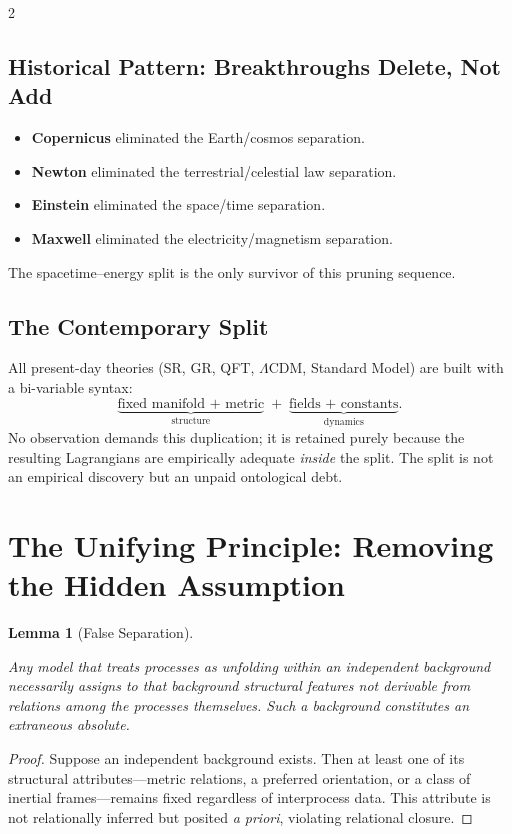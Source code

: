 \documentclass[10pt, a4paper]{article}
\newtheorem{lemma}[theorem]{Lemma}
\begin{document}
\begin{multicols}{2}
\subsection{Historical Pattern: Breakthroughs Delete, Not Add}
\begin{itemize}[nosep]
  \item \textbf{Copernicus} eliminated the Earth/cosmos separation.
  \item \textbf{Newton} eliminated the terrestrial/celestial law separation.
  \item \textbf{Einstein} eliminated the space/time separation.
  \item \textbf{Maxwell} eliminated the electricity/magnetism separation.
\end{itemize}
The spacetime--energy split is the only survivor of this pruning sequence.

\subsection{The Contemporary Split}
All present-day theories (SR, GR, QFT, $\Lambda$CDM, Standard Model) are built with a bi-variable syntax:
\[
\underbrace{\text{fixed manifold + metric}}_{\text{structure}}
\;+\;
\underbrace{\text{fields + constants}}_{\text{dynamics}}.
\]
No observation demands this duplication; it is retained purely because the resulting Lagrangians are empirically adequate \emph{inside} the split. The split is not an empirical discovery but an unpaid ontological debt.



\section{The Unifying Principle: Removing the Hidden Assumption}

\begin{lemma}[False Separation]
\hypertarget{lem:false-separation}{}\label{lem:false-separation}
Any model that treats processes as unfolding \emph{within} an independent background necessarily assigns to that background structural features not derivable from relations among the processes themselves. Such a background constitutes an \emph{extraneous absolute}.
\end{lemma}

\begin{proof}
Suppose an independent background exists. Then at least one of its structural attributes---metric relations, a preferred orientation, or a class of inertial frames---remains fixed regardless of interprocess data. This attribute is not relationally inferred but posited \textit{a priori}, violating relational closure.
\end{proof}


\end{multicols}
\end{document}
